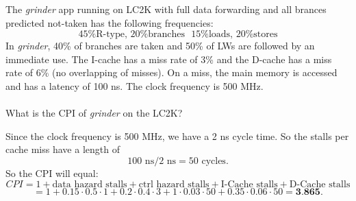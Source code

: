 
\begin{problem}
  The \emph{grinder} app running on LC2K with full data forwarding and all brances predicted not-taken has the following frequencies:
  \[
    \text{45\% R-type, 20\% branches} \: \: \: \text{15\% loads, 20\% stores}  
  \]
  In \emph{grinder}, 40\% of branches are taken and 50\% of LWs are followed by an immediate use. The I-cache has a miss rate of 3\% and the D-cache has a miss rate of 6\% (no overlapping of misses). On a miss, the main memory is accessed and has a latency of 100 ns. The clock frequency is 500 MHz. \\
  \\
  What is the CPI of \emph{grinder} on the LC2K?
\end{problem}
\begin{answer}
  Since the clock frequency is 500 MHz, we have a 2 ns cycle time. So the stalls per cache miss have a length of
  \[
    100 \text{ ns} / 2 \text{ ns} = 50 \text{ cycles}.
  \]
  So the CPI will equal:
  \[
    CPI = 1 + \text{data hazard stalls} + \text{ctrl hazard stalls} + \text{I-Cache stalls} + \text{D-Cache stalls}
  \]
  \[
    = 1 + 0.15 \cdot 0.5 \cdot 1 + 0.2 \cdot 0.4 \cdot 3 + 1 \cdot 0.03 \cdot 50 + 0.35 \cdot 0.06 \cdot 50 = \textbf{3.865}.
  \]
\end{answer}

